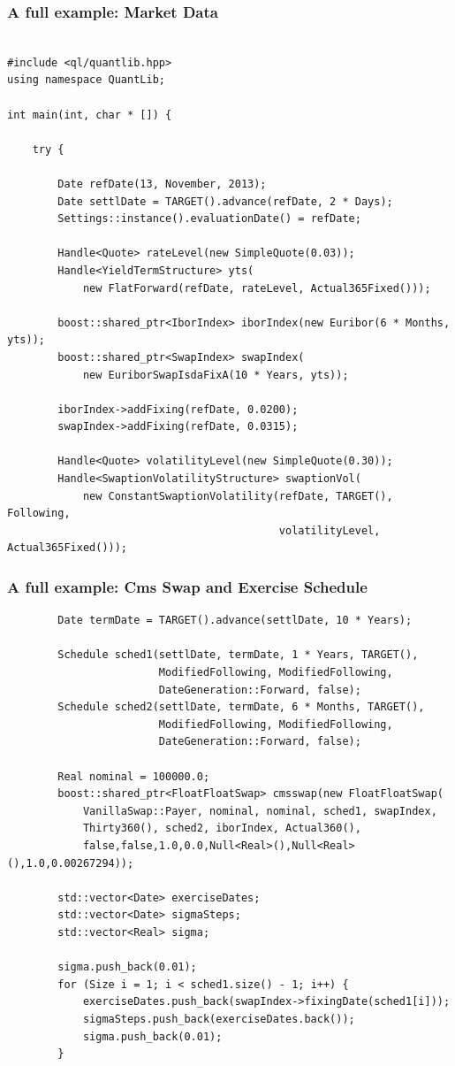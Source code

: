 \documentclass{beamer}
\begin{document}
\begin{frame}[fragile]
\frametitle{A full example: Market Data}
\begin{verbatim}

#include <ql/quantlib.hpp>
using namespace QuantLib;

int main(int, char * []) {

    try {

        Date refDate(13, November, 2013);
        Date settlDate = TARGET().advance(refDate, 2 * Days);
        Settings::instance().evaluationDate() = refDate;

        Handle<Quote> rateLevel(new SimpleQuote(0.03));
        Handle<YieldTermStructure> yts(
            new FlatForward(refDate, rateLevel, Actual365Fixed()));

        boost::shared_ptr<IborIndex> iborIndex(new Euribor(6 * Months, yts));
        boost::shared_ptr<SwapIndex> swapIndex(
            new EuriborSwapIsdaFixA(10 * Years, yts));

        iborIndex->addFixing(refDate, 0.0200);
        swapIndex->addFixing(refDate, 0.0315);

        Handle<Quote> volatilityLevel(new SimpleQuote(0.30));
        Handle<SwaptionVolatilityStructure> swaptionVol(
            new ConstantSwaptionVolatility(refDate, TARGET(), Following,
                                           volatilityLevel, Actual365Fixed()));

\end{verbatim}
\end{frame}

\begin{frame}[fragile]
\frametitle{A full example: Cms Swap and Exercise Schedule}
\begin{verbatim}
        Date termDate = TARGET().advance(settlDate, 10 * Years);

        Schedule sched1(settlDate, termDate, 1 * Years, TARGET(),
                        ModifiedFollowing, ModifiedFollowing,
                        DateGeneration::Forward, false);
        Schedule sched2(settlDate, termDate, 6 * Months, TARGET(),
                        ModifiedFollowing, ModifiedFollowing,
                        DateGeneration::Forward, false);

        Real nominal = 100000.0;
        boost::shared_ptr<FloatFloatSwap> cmsswap(new FloatFloatSwap(
            VanillaSwap::Payer, nominal, nominal, sched1, swapIndex,
            Thirty360(), sched2, iborIndex, Actual360(),
            false,false,1.0,0.0,Null<Real>(),Null<Real>(),1.0,0.00267294));

        std::vector<Date> exerciseDates;
        std::vector<Date> sigmaSteps;
        std::vector<Real> sigma;

        sigma.push_back(0.01);
        for (Size i = 1; i < sched1.size() - 1; i++) {
            exerciseDates.push_back(swapIndex->fixingDate(sched1[i]));
            sigmaSteps.push_back(exerciseDates.back());
            sigma.push_back(0.01);
        }
\end{verbatim}
\end{frame}
\end{document}
